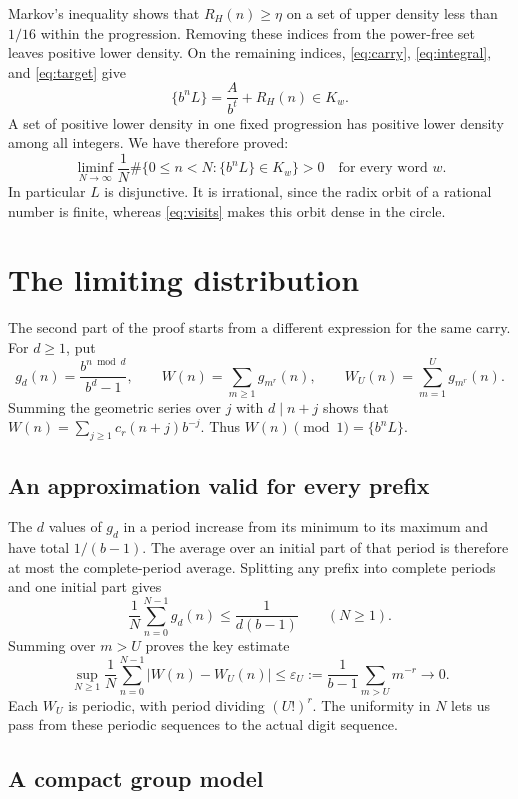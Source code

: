 \documentclass[11pt]{article}
\begin{document}
Markov's inequality shows that $R_H(n)\ge\eta$ on a set of upper
density less than $1/16$ within the progression. Removing these indices
from the power-free set leaves positive lower density. On the remaining
indices, \eqref{eq:carry}, \eqref{eq:integral}, and \eqref{eq:target} give
\[
\{b^nL\}=\frac A{b^t}+R_H(n)\in K_w.
\]
A set of positive lower density in one fixed progression has positive
lower density among all integers. We have therefore proved:
\begin{equation}\label{eq:visits}
\liminf_{N\to\infty}\frac1N
 \#\{0\le n<N:\{b^nL\}\in K_w\}>0
\quad\text{for every word }w.
\end{equation}
In particular $L$ is disjunctive. It is irrational, since the radix orbit
of a rational number is finite, whereas \eqref{eq:visits} makes this
orbit dense in the circle.

\section{The limiting distribution}

The second part of the proof starts from a different expression for the
same carry. For $d\ge1$, put
\[
g_d(n)=\frac{b^{n\bmod d}}{b^d-1},\qquad
W(n)=\sum_{m\ge1}g_{m^r}(n),\qquad
W_U(n)=\sum_{m=1}^{U}g_{m^r}(n).
\]
Summing the geometric series over $j$ with $d\mid n+j$ shows that
$W(n)=\sum_{j\ge1}c_r(n+j)b^{-j}$. Thus $W(n)\pmod1=\{b^nL\}$.

\subsection*{An approximation valid for every prefix}

The $d$ values of $g_d$ in a period increase from its minimum to its
maximum and have total $1/(b-1)$. The average over an initial part of
that period is therefore at most the complete-period average.
Splitting any prefix into complete periods and one initial part gives
\[
\frac1N\sum_{n=0}^{N-1}g_d(n)\le\frac{1}{d(b-1)}
\qquad(N\ge1).
\]
Summing over $m>U$ proves the key estimate
\begin{equation}\label{eq:uniform}
\sup_{N\ge1}\frac1N\sum_{n=0}^{N-1}|W(n)-W_U(n)|
\le\varepsilon_U:=\frac{1}{b-1}\sum_{m>U}m^{-r}
\longrightarrow0.
\end{equation}
Each $W_U$ is periodic, with period dividing $(U!)^r$.
The uniformity in $N$ lets us pass from these periodic sequences to the
actual digit sequence.

\subsection*{A compact group model}
\end{document}
